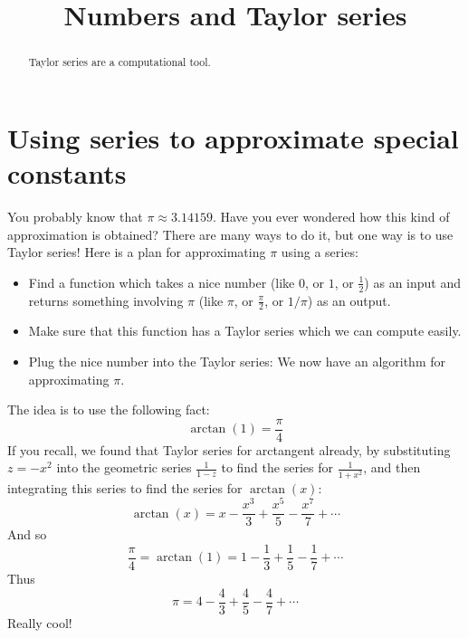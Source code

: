 \documentclass{ximera}
\title[Dig-In:]{Numbers and Taylor series}
\begin{document}
\begin{abstract}
  Taylor series are a computational tool.
\end{abstract}
\maketitle

\section{Using series to approximate special constants}

You probably know that $\pi \approx 3.14159$.  Have you ever wondered
how this kind of approximation is obtained?  There are many ways to
do it, but one way is to use Taylor series!  Here is a plan for
approximating $\pi$ using a series:
\begin{itemize}
\item Find a function which takes a nice number (like $0$, or $1$,
    or $\frac{1}{2}$) as an input and returns something involving
    $\pi$ (like $\pi$, or $\frac{\pi}{2}$, or $1/\pi$) as an output.
  \item Make sure that this function has a Taylor series which we can
    compute easily.
  \item Plug the nice number into the Taylor series: We now have an
    algorithm for approximating $\pi$.
\end{itemize} 
The idea is to use the following fact:
\[
\arctan(1) = \frac{\pi}{4}
\]
If you recall, we found that Taylor series for arctangent already, by
substituting $z=-x^2$ into the geometric series $\frac{1}{1-z}$ to
find the series for $\frac{1}{1+x^2}$, and then integrating this
series to find the series for $\arctan(x)$:
\[
\arctan(x) = x-\frac{x^3}{3}+\frac{x^5}{5}-\frac{x^7}{7}+\cdots
\]
And so 
\[
\frac{\pi}{4} = \arctan(1) = 1-\frac{1}{3}+\frac{1}{5}-\frac{1}{7}+\cdots
\]
Thus
\[
\pi =  4-\frac{4}{3}+\frac{4}{5}-\frac{4}{7}+\cdots
\]
Really cool!
\end{document}
